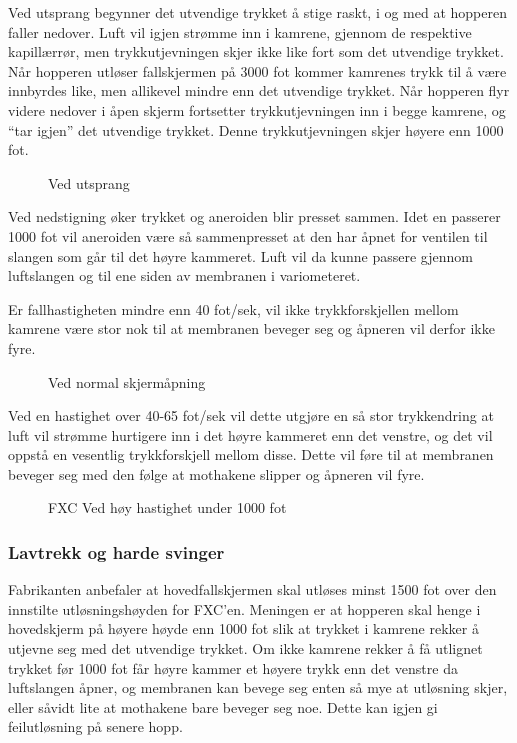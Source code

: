 Ved utsprang begynner det utvendige trykket å stige raskt, i og med at hopperen faller nedover. Luft vil igjen strømme inn i kamrene, gjennom de respektive kapillærrør, men trykkutjevningen skjer ikke like fort som det utvendige trykket. Når hopperen utløser fallskjermen på 3000 fot kommer kamrenes trykk til å være innbyrdes like, men allikevel mindre enn det utvendige trykket. Når hopperen flyr videre nedover i åpen skjerm fortsetter trykkutjevningen inn i begge kamrene, og ``tar igjen'' det utvendige trykket. Denne trykkutjevningen skjer høyere enn 1000 fot.

\begin{figure}
	\caption{Ved utsprang}
\end{figure}

Ved nedstigning øker trykket og aneroiden blir presset sammen. Idet en passerer 1000 fot vil aneroiden være så sammenpresset at den har åpnet for ventilen til slangen som går til det høyre kammeret. Luft vil da kunne passere gjennom luftslangen og til ene siden av membranen i variometeret.

Er fallhastigheten mindre enn 40 fot/sek, vil ikke trykkforskjellen mellom kamrene være stor nok til at membranen beveger seg og åpneren vil derfor ikke fyre.

\begin{figure}
	\caption{Ved normal skjermåpning}
\end{figure}

Ved en hastighet over 40-65 fot/sek vil dette utgjøre en så stor trykkendring at luft vil strømme hurtigere inn i det høyre kammeret enn det venstre, og det vil oppstå en vesentlig trykkforskjell mellom disse. Dette vil føre til at membranen beveger seg med den følge at mothakene slipper og åpneren vil fyre.

\begin{figure}
	\caption{FXC Ved høy hastighet under 1000 fot}
\end{figure}

\subsubsection{Lavtrekk og harde svinger}
Fabrikanten anbefaler at hovedfallskjermen skal utløses minst 1500 fot over den innstilte utløsningshøyden for FXC’en. Meningen er at hopperen skal henge i hovedskjerm på høyere høyde enn 1000 fot slik at trykket i kamrene rekker å utjevne seg med det utvendige trykket. Om ikke kamrene rekker å få utlignet trykket før 1000 fot får høyre kammer et høyere trykk enn det venstre da luftslangen åpner, og membranen kan bevege seg enten så mye at utløsning skjer, eller såvidt lite at mothakene bare beveger seg noe. Dette kan igjen gi feilutløsning på senere hopp.

